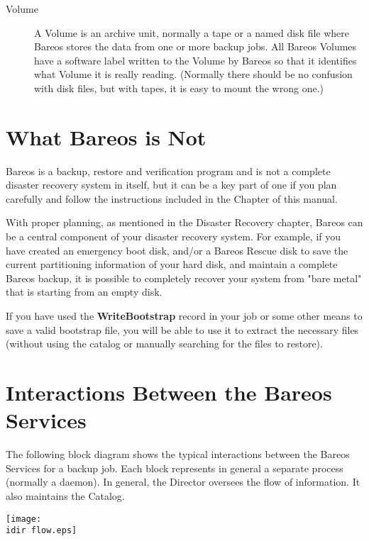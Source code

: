 \begin{description}
\item [Volume]
   A Volume is an archive unit, normally a tape or a named disk file where
   Bareos stores the data from one or more backup jobs.  All Bareos Volumes
   have a software label written to the Volume by Bareos so that it
   identifies what Volume it is really reading.  (Normally there should be
   no confusion with disk files, but with tapes, it is easy to mount the
   wrong one.)
\end{description}

\section{What Bareos is Not}

Bareos is a backup, restore and verification program and is not a
complete disaster recovery system in itself, but it can be a key part of one
if you plan carefully and follow the instructions included in the
 Chapter of this manual.

With proper planning, as mentioned in the Disaster Recovery chapter,
Bareos can be a central component of your disaster recovery system. For
example, if you have created an emergency boot disk, and/or a Bareos Rescue disk to
save the current partitioning information of your hard disk, and maintain a
complete Bareos backup, it is possible to completely recover your system from
"bare metal" that is starting from an empty disk.

If you have used the {\bf WriteBootstrap} record in your job or some other
means to save a valid bootstrap file, you will be able to use it to extract
the necessary files (without using the catalog or manually searching for the
files to restore).

\section{Interactions Between the Bareos Services}

The following block diagram shows the typical interactions between the Bareos
Services for a backup job. Each block represents in general a separate process
(normally a daemon). In general, the Director oversees the flow of
information. It also maintains the Catalog.

\texttt{[image: \\idir flow.eps]}
